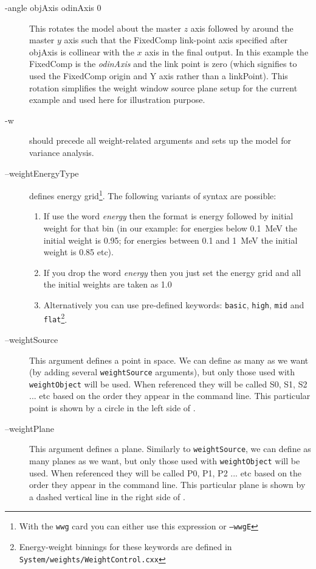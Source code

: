 \begin{description}
\begin{description}
\item[-angle objAxis odinAxis 0] This rotates the model about the 
  master $z$ axis followed by around the master $y$ axis such that
  the FixedComp link-point axis specified after objAxis is collinear with the
  $x$ axis in the final output. In this example the FixedComp is the {\it odinAxis}
  and the link point is zero (which signifies to used the FixedComp origin and Y axis
  rather than a linkPoint).
  This rotation simplifies the weight window source plane setup
  for the current example and used here for illustration purpose.

\item[-w] should precede all weight-related arguments and sets up the model for variance analysis.
  
\item[--weightEnergyType] defines energy grid\footnote{With the {\tt wwg} card you can either use this expression or
  {\tt --wwgE}}.
  The following variants of syntax are possible:
  \begin{enumerate}

    \item If use the word {\em energy} then the format is energy followed by initial weight for that bin
      (in our example: for energies below \SI{0.1}{\mega\electronvolt} the initial weight is \num{0.95};
          for energies between \num{0.1} and \SI{1}{\mega\electronvolt} the initial weight is \num{0.85} etc).
        \item If you drop the word {\em energy} then you just set the energy grid and all the initial weights are
          taken as 1.0
    \item Alternatively you can use pre-defined keywords:
      {\tt basic}, {\tt high}, {\tt mid} and {\tt flat}\footnote{Energy-weight binnings for these keywords are defined in \tt{System/weights/WeightControl.cxx}}.
  \end{enumerate}
  
\item[--weightSource] This argument defines a point in space.
  We can define as many as we want (by adding several {\tt weightSource} arguments),
  but only those used with {\tt weightObject} will be used. When referenced they will be called S0, S1, S2 ... etc
  based on the order they appear in the command line.
  This particular point is shown by a circle in the left side of .
  
\item[--weightPlane] This argument defines a plane. Similarly to {\tt weightSource}, we can define as many planes as we want,
  but only those used with {\tt weightObject} will be used.
  When referenced they will be called P0, P1, P2 ... etc based on the order they appear in the command line.
  This particular plane is shown by a dashed vertical line in the right side of .
  

\end{description}
\end{description}
